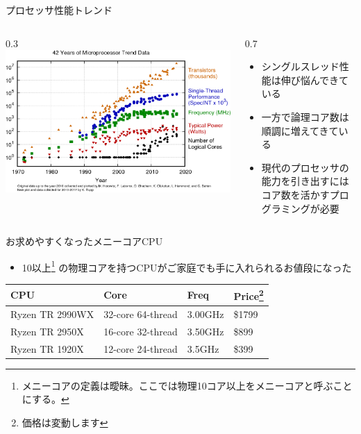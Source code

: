 \documentclass[unicode,12pt]{beamer}
\newlength{\mytotalwidth}
\newlength{\mycolumnwidth}
\begin{document}
\begin{frame}{プロセッサ性能トレンド}
  \begin{columns}[totalwidth=\mytotalwidth]
    \begin{column}[T]{0.3\mycolumnwidth}
      \centering
      \includegraphics[width=\columnwidth]{pic/42-years-processor-trend.png}
    \end{column}
    \begin{column}[t]{0.7\mycolumnwidth}
      \begin{itemize}
      \item シングルスレッド性能は伸び悩んできている
      \item 一方で論理コア数は順調に増えてきている
      \item \alert{現代のプロセッサの能力を引き出すにはコア数を活かすプログラミングが必要}
      \end{itemize}
    \end{column}
  \end{columns}
\end{frame}

\begin{frame}{お求めやすくなったメニーコアCPU}
  \begin{itemize}
  \item 10以上\footnote{メニーコアの定義は曖昧。ここでは物理10コア以上をメニーコアと呼ぶことにする。}
    の物理コアを持つCPUがご家庭でも手に入れられるお値段になった
    \end{itemize}
  \begin{tabular}{llll} \hline
    CPU & Core & Freq & Price\footnote{価格は変動します} \\ \hline
    Ryzen TR 2990WX & 32-core 64-thread & 3.00GHz & \$1799 \\
    Ryzen TR 2950X & 16-core 32-thread & 3.50GHz & \$899 \\
    Ryzen TR 1920X & 12-core 24-thread & 3.5GHz & \$399 \\
    \hline
  \end{tabular}
\end{frame}
\end{document}
